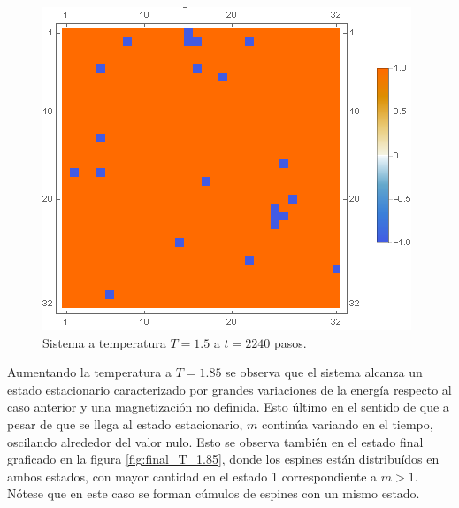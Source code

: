 \documentclass[aps,prb,twocolumn,superscriptaddress,floatfix,longbibliography]{revtex4-2}
\begin{document}
\begin{figure}[h]
    \includegraphics[clip=true,width=\columnwidth]{final_T_1.5.png}
    \caption{Sistema a temperatura $T = 1.5$ a $t = 2240$ pasos.}
     \label{fig:final_T_1.5}
\end{figure}


Aumentando la temperatura a $T= 1.85$ se observa que el sistema alcanza un estado estacionario caracterizado por grandes variaciones de la energía respecto al caso anterior y una magnetización no definida. Esto último en el sentido de que a pesar de que se llega al estado estacionario, $m$ continúa variando en el tiempo, oscilando alrededor del valor nulo. Esto se observa también en el estado final graficado en la figura \ref{fig:final_T_1.85}, donde los espines están distribuídos en ambos estados, con mayor cantidad en el estado 1 correspondiente a $m>1$. Nótese que en este caso se forman cúmulos de espines con un mismo estado.
\end{document}
